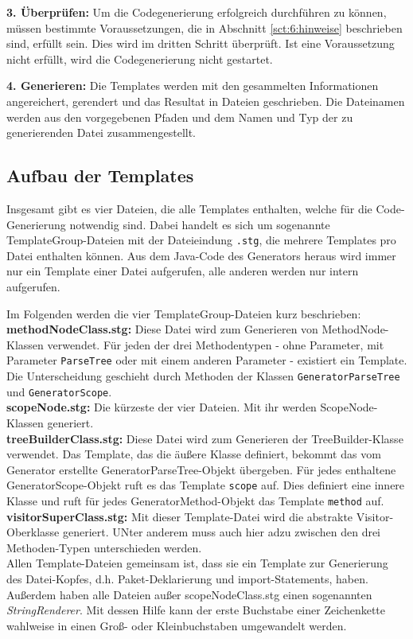 \textbf{3. Überprüfen:} Um die Codegenerierung erfolgreich durchführen zu können, müssen bestimmte Voraussetzungen, die in Abschnitt \ref{sct:6:hinweise} beschrieben sind, erfüllt sein. Dies wird im dritten Schritt überprüft. Ist eine Voraussetzung nicht erfüllt, wird die Codegenerierung nicht gestartet.

\textbf{4. Generieren:} Die Templates werden mit den gesammelten Informationen angereichert, gerendert und das Resultat in Dateien geschrieben. Die Dateinamen werden aus den vorgegebenen Pfaden und dem Namen und Typ der zu generierenden Datei zusammengestellt.

\subsection{Aufbau der Templates}\label{ssct:5.2.3:templates}
Insgesamt gibt es vier Dateien, die alle Templates enthalten, welche für die Code-Generierung notwendig sind. Dabei handelt es sich um sogenannte TemplateGroup-Dateien mit der Dateieindung \texttt{.stg}, die mehrere Templates pro Datei enthalten können. Aus dem Java-Code des Generators heraus wird immer nur ein Template einer Datei aufgerufen, alle anderen werden nur intern aufgerufen.

Im Folgenden werden die vier TemplateGroup-Dateien kurz beschrieben:\\

\noindent
\textbf{methodNodeClass.stg:} Diese Datei wird zum Generieren von MethodNode-Klassen verwendet. Für jeden der drei Methodentypen - ohne Parameter, mit Parameter \texttt{ParseTree} oder mit einem anderen Parameter - existiert ein Template. Die Unterscheidung geschieht durch Methoden der Klassen \texttt{GeneratorParseTree} und \texttt{GeneratorScope}.\\

\noindent
\textbf{scopeNode.stg:} Die kürzeste der vier Dateien. Mit ihr werden ScopeNode-Klassen generiert.\\

\noindent
\textbf{treeBuilderClass.stg:} Diese Datei wird zum Generieren der TreeBuilder-Klasse verwendet. Das Template, das die äußere Klasse definiert, bekommt das vom Generator erstellte GeneratorParseTree-Objekt übergeben. Für jedes enthaltene GeneratorScope-Objekt ruft es das Template \texttt{scope} auf. Dies definiert eine innere Klasse und ruft für jedes GeneratorMethod-Objekt das Template \texttt{method} auf.\\

\noindent
\textbf{visitorSuperClass.stg:} Mit dieser Template-Datei wird die abstrakte Visitor-Oberklasse generiert. UNter anderem muss auch hier adzu zwischen den drei Methoden-Typen unterschieden werden.\\

\noindent
Allen Template-Dateien gemeinsam ist, dass sie ein Template zur Generierung des Datei-Kopfes, d.h. Paket-Deklarierung und import-Statements, haben. Außerdem haben alle Dateien außer scopeNodeClass.stg einen sogenannten \emph{StringRenderer}. Mit dessen Hilfe kann der erste Buchstabe einer Zeichenkette wahlweise in einen Groß- oder Kleinbuchstaben umgewandelt werden.

